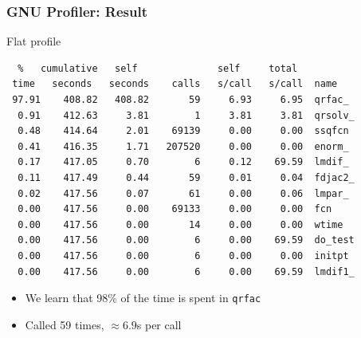 \documentclass[xcolor={x11names,svgnames}]{beamer}
\begin{document}

\begin{frame}[fragile]
  \frametitle{GNU Profiler: Result}

  \begin{block}{Flat profile}
  \scriptsize
\begin{verbatim}
  %   cumulative   self              self     total           
 time   seconds   seconds    calls   s/call   s/call  name    
 97.91    408.82   408.82       59     6.93     6.95  qrfac_
  0.91    412.63     3.81        1     3.81     3.81  qrsolv_
  0.48    414.64     2.01    69139     0.00     0.00  ssqfcn
  0.41    416.35     1.71   207520     0.00     0.00  enorm_
  0.17    417.05     0.70        6     0.12    69.59  lmdif_
  0.11    417.49     0.44       59     0.01     0.04  fdjac2_
  0.02    417.56     0.07       61     0.00     0.06  lmpar_
  0.00    417.56     0.00    69133     0.00     0.00  fcn
  0.00    417.56     0.00       14     0.00     0.00  wtime
  0.00    417.56     0.00        6     0.00    69.59  do_test
  0.00    417.56     0.00        6     0.00     0.00  initpt
  0.00    417.56     0.00        6     0.00    69.59  lmdif1_
\end{verbatim}
\end{block}

\begin{itemize}
\item We learn that 98\% of the time is spent in \texttt{qrfac}
\item Called 59 times, $\approx 6.9$s per call
\end{itemize}
\end{frame}

\end{document}
